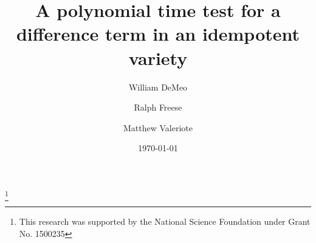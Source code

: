 


\usepackage{color}
\usepackage{amsmath}
\usepackage{amsfonts}
\usepackage{amscd}
\usepackage{inputs/rflatexmacs}
\usepackage{inputs/wjdlatexmacs}

\usepackage[mathcal]{euscript}
\usepackage{comment}

\renewcommand{\th}[2]{#1\mathrel{\theta}#2}
\newcommand{\infixrel}[3]{#2\mathrel{#1}#3}



\newtheorem{theorem}{Theorem}
\newtheorem{lemma}[theorem]{Lemma}
\newtheorem{corollary}[theorem]{Corollary}
\newtheorem{prop}[theorem]{Proposition}
\newtheorem{conjecture}[theorem]{Conjecture}
\theoremstyle{definition}
\newtheorem{example}[theorem]{Example}
\newtheorem{fact}[theorem]{Fact}
\newtheorem{remark}{Remark}
\newtheorem*{remarks}{Remarks}
\newtheorem*{rem}{Remark}
\newtheorem{prob}{Problem}

\title[A test for a difference term]{A polynomial time test for a
difference term in an idempotent variety}
\author[DeMeo]{William DeMeo}
\address[William DeMeo]{
Department of Mathematics\\
University of Hawaii\\
Honolulu, Hawaii\\
96822 USA}
\author[Freese]{Ralph Freese}
\address[Ralph Freese]{
Department of Mathematics\\
University of Hawaii\\
Honolulu, Hawaii\\
96822 USA}
\author[Valeriote]{Matthew Valeriote}
\address[Matthew Valeriote]{
Department of Mathematics\\
McMaster University\\
Hamilton, Ontario\\
xxxxx Canada}

\thanks{This research was supported by the National
Science Foundation under Grant No. 1500235}

\date{\today}



\maketitle 

